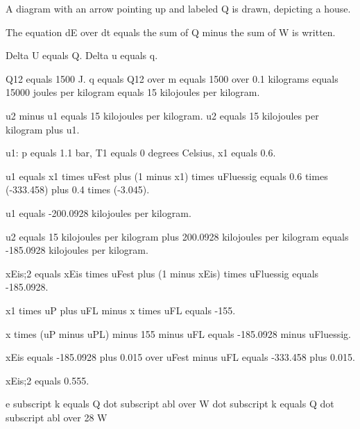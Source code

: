 A diagram with an arrow pointing up and labeled Q is drawn, depicting a house.

The equation dE over dt equals the sum of Q minus the sum of W is written.

Delta U equals Q. Delta u equals q.

Q12 equals 1500 J. q equals Q12 over m equals 1500 over 0.1 kilograms equals 15000 joules per kilogram equals 15 kilojoules per kilogram.

u2 minus u1 equals 15 kilojoules per kilogram. u2 equals 15 kilojoules per kilogram plus u1.

u1: p equals 1.1 bar, T1 equals 0 degrees Celsius, x1 equals 0.6.

u1 equals x1 times uFest plus (1 minus x1) times uFluessig equals 0.6 times (-333.458) plus 0.4 times (-3.045).

u1 equals -200.0928 kilojoules per kilogram.

u2 equals 15 kilojoules per kilogram plus 200.0928 kilojoules per kilogram equals -185.0928 kilojoules per kilogram.

xEis;2 equals xEis times uFest plus (1 minus xEis) times uFluessig equals -185.0928.

x1 times uP plus uFL minus x times uFL equals -155.

x times (uP minus uPL) minus 155 minus uFL equals -185.0928 minus uFluessig.

xEis equals -185.0928 plus 0.015 over uFest minus uFL equals -333.458 plus 0.015.

xEis;2 equals 0.555.

e subscript k equals Q dot subscript abl over W dot subscript k equals Q dot subscript abl over 28 W